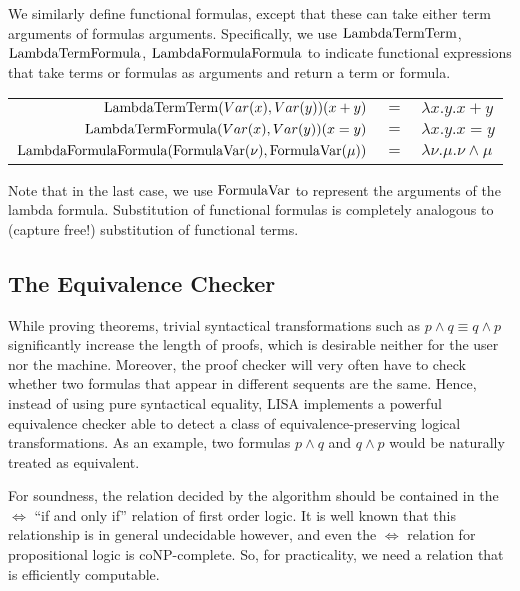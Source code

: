 We similarly define functional formulas, except that these can take either term arguments of formulas arguments. Specifically, we use $\operatorname{LambdaTermTerm}$, $\operatorname{LambdaTermFormula}$, $\operatorname{LambdaFormulaFormula}$ to indicate functional expressions that take terms or formulas as arguments and return a term or formula.

\begin{ex}
\begin{center}
\begin{tabular}{|r c l|}
\hline
$\operatorname{LambdaTermTerm}(Var(x), Var(y))(x+y)$ & $=$ & $\lambda x.y. x+y$ \\
$\operatorname{LambdaTermFormula}(Var(x), Var(y))(x=y)$ & $=$ & $\lambda x.y. x=y$ \\
$\operatorname{LambdaFormulaFormula}(\operatorname{FormulaVar}(\nu), \operatorname{FormulaVar}(\mu))$ & $=$ & $\lambda \nu.\mu. \nu \land \mu$ \\
\hline
\end{tabular}
\end{center}

\end{ex}

Note that in the last case, we use $\operatorname{FormulaVar}$ to represent the arguments of the lambda formula. Substitution of functional formulas is completely analogous to (capture free!) substitution of functional terms.




\subsection{The Equivalence Checker}
\label{subs:equivalencechecker}

While proving theorems, trivial syntactical transformations such as $p\land q \equiv q\land p$ significantly increase the length of proofs, which is desirable neither for the user nor the machine. Moreover, the proof checker will very often have to check whether two formulas that appear in different sequents are the same. Hence, instead of using pure syntactical equality, LISA implements a powerful equivalence checker able to detect a class of equivalence-preserving logical transformations. As an example, two formulas $p\land q$ and $q\land p$ would be naturally treated as equivalent.

For soundness, the relation decided by the algorithm should be contained in the $\Longleftrightarrow$ ``if and only if'' relation of first order logic. It is well known that this relationship is in general undecidable however, and even the $\Longleftrightarrow$ relation for propositional logic is coNP-complete. So, for practicality, we need a relation that is efficiently computable.

